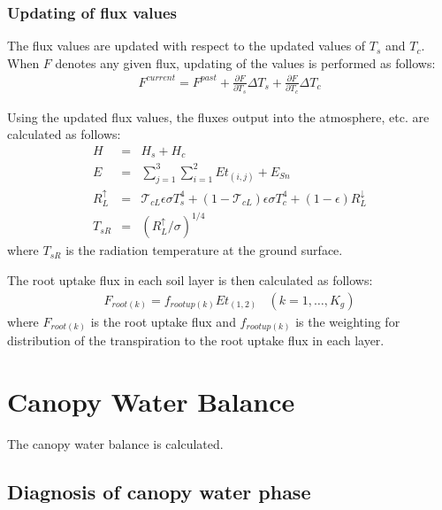 \subsubsection{Updating of flux values}\label{updating-of-flux-values}

The flux values are updated with respect to the updated values of \(T_s\) and \(T_c\). When \(F\) denotes any given flux, updating of the values is performed as follows: \begin{eqnarray}
 F^{current} = F^{past} + \frac{\partial F}{\partial T_s} \Delta T_s
                        + \frac{\partial F}{\partial T_c} \Delta T_c
\end{eqnarray}

Using the updated flux values, the fluxes output into the atmosphere, etc. are calculated as follows: \begin{eqnarray}
 H &=& H_s + H_c \\
 E &=& \sum_{j=1}^3 \sum_{i=1}^2 Et_{(i,j)} + E_{Sn} \\
 R^{\uparrow}_L &=& {\mathcal{T}}_{cL} \epsilon \sigma T_s^4
 + (1 - {\mathcal{T}}_{cL}) \epsilon \sigma T_c^4
 + (1 - \epsilon) R^{\downarrow}_L \\
 T_{sR} &=& ( R^{\uparrow}_L / \sigma )^{1/4}
\end{eqnarray} where \(T_{sR}\) is the radiation temperature at the ground surface.

The root uptake flux in each soil layer is then calculated as follows: \begin{eqnarray}
 F_{root(k)} = f_{rootup(k)} Et_{(1,2)} \ \ \ \ (k=1,\ldots,K_g)
\end{eqnarray} where \(F_{root(k)}\) is the root uptake flux and \(f_{rootup(k)}\) is the weighting for distribution of the transpiration to the root uptake flux in each layer.

\section{Canopy Water Balance}\label{canopy-water-balance}

The canopy water balance is calculated.

\subsection{Diagnosis of canopy water phase}\label{diagnosis-of-canopy-water-phase}

